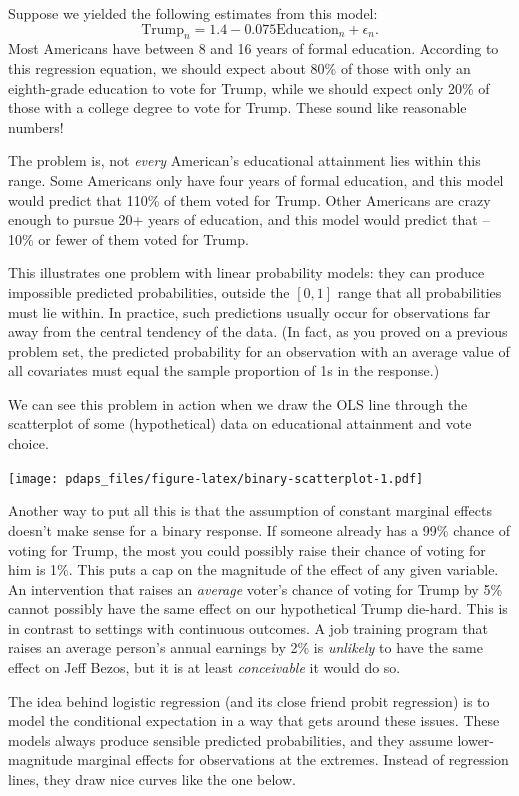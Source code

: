 \documentclass[
  12pt,
  oneside,openany]{book}
\begin{document}
Suppose we yielded the following estimates from this model:
\[
\text{Trump}_n = 1.4 - 0.075 \text{Education}_n + \epsilon_n.
\]
Most Americans have between 8 and 16 years of formal education.
According to this regression equation, we should expect about 80\% of those with only an eighth-grade education to vote for Trump, while we should expect only 20\% of those with a college degree to vote for Trump.
These sound like reasonable numbers!

The problem is, not \emph{every} American's educational attainment lies within this range.
Some Americans only have four years of formal education, and this model would predict that 110\% of them voted for Trump.
Other Americans are crazy enough to pursue 20+ years of education, and this model would predict that --10\% or fewer of them voted for Trump.

This illustrates one problem with linear probability models: they can produce impossible predicted probabilities, outside the \([0, 1]\) range that all probabilities must lie within.
In practice, such predictions usually occur for observations far away from the central tendency of the data.
(In fact, as you proved on a previous problem set, the predicted probability for an observation with an average value of all covariates must equal the sample proportion of 1s in the response.)

We can see this problem in action when we draw the OLS line through the scatterplot of some (hypothetical) data on educational attainment and vote choice.

\texttt{[image: pdaps\_files/figure-latex/binary-scatterplot-1.pdf]}

Another way to put all this is that the assumption of constant marginal effects doesn't make sense for a binary response.
If someone already has a 99\% chance of voting for Trump, the most you could possibly raise their chance of voting for him is 1\%.
This puts a cap on the magnitude of the effect of any given variable.
An intervention that raises an \emph{average} voter's chance of voting for Trump by 5\% cannot possibly have the same effect on our hypothetical Trump die-hard.
This is in contrast to settings with continuous outcomes.
A job training program that raises an average person's annual earnings by 2\% is \emph{unlikely} to have the same effect on Jeff Bezos, but it is at least \emph{conceivable} it would do so.

The idea behind logistic regression (and its close friend probit regression) is to model the conditional expectation in a way that gets around these issues.
These models always produce sensible predicted probabilities, and they assume lower-magnitude marginal effects for observations at the extremes.
Instead of regression lines, they draw nice curves like the one below.
\end{document}
